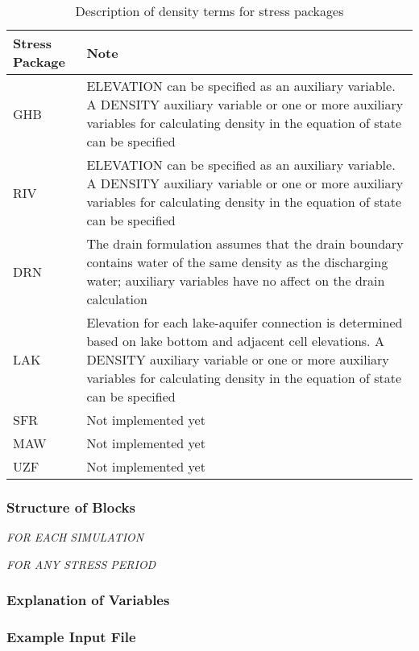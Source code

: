 \begin{longtable}{p{3cm} p{12cm}}
\caption{Description of density terms for stress packages}
\tabularnewline
\hline
\hline
\textbf{Stress Package} & \textbf{Note} \\
\hline
\endhead
\hline
\endfoot
GHB & ELEVATION can be specified as an auxiliary variable.  A DENSITY auxiliary variable or one or more auxiliary variables for calculating density in the equation of state can be specified \\
RIV & ELEVATION can be specified as an auxiliary variable.  A DENSITY auxiliary variable or one or more auxiliary variables for calculating density in the equation of state can be specified \\
DRN & The drain formulation assumes that the drain boundary contains water of the same density as the discharging water; auxiliary variables have no affect on the drain calculation  \\
LAK & Elevation for each lake-aquifer connection is determined based on lake bottom and adjacent cell elevations. A DENSITY auxiliary variable or one or more auxiliary variables for calculating density in the equation of state can be specified \\
SFR & Not implemented yet \\
MAW & Not implemented yet \\
UZF & Not implemented yet \\
\end{longtable}

\vspace{5mm}
\subsubsection{Structure of Blocks}

\vspace{5mm}
\noindent \textit{FOR EACH SIMULATION}



\vspace{5mm}
\noindent \textit{FOR ANY STRESS PERIOD}


\vspace{5mm}
\subsubsection{Explanation of Variables}
\begin{description}

\end{description}

\vspace{5mm}
\subsubsection{Example Input File}


